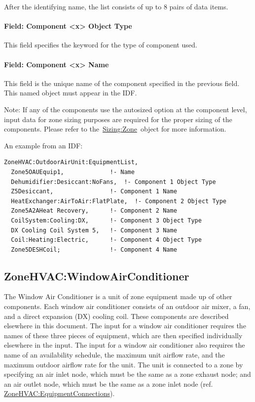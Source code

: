 After the identifying name, the list consists of up to 8 pairs of data items.

\paragraph{Field: Component \textless{}x\textgreater{} Object Type}\label{field-component-x-object-type-000}

This field specifies the keyword for the type of component used.

\paragraph{Field: Component \textless{}x\textgreater{} Name}\label{field-component-x-name-000}

This field is the unique name of the component specified in the previous field. This named object must appear in the IDF.

Note: If any of the components use the autosized option at the component level, input data for zone sizing purposes are required for the proper sizing of the components. Please refer to the~\hyperref[sizingzone]{Sizing:Zone}~object for more information.

An example from an IDF:

\begin{lstlisting}
ZoneHVAC:OutdoorAirUnit:EquipmentList,
  Zone5OAUEquip1,             !- Name
  Dehumidifier:Desiccant:NoFans,  !- Component 1 Object Type
  Z5Desiccant,                !- Component 1 Name
  HeatExchanger:AirToAir:FlatPlate,  !- Component 2 Object Type
  Zone5A2AHeat Recovery,      !- Component 2 Name
  CoilSystem:Cooling:DX,      !- Component 3 Object Type
  DX Cooling Coil System 5,   !- Component 3 Name
  Coil:Heating:Electric,      !- Component 4 Object Type
  Zone5DESHCoil;              !- Component 4 Name
\end{lstlisting}

\subsection{ZoneHVAC:WindowAirConditioner}\label{zonehvacwindowairconditioner}

The Window Air Conditioner is a unit of zone equipment made up of other components. Each window air conditioner consists of an outdoor air mixer, a fan, and a direct expansion (DX) cooling coil. These components are described elsewhere in this document. The input for a window air conditioner requires the names of these three pieces of equipment, which are then specified individually elsewhere in the input. The input for a window air conditioner also requires the name of an availability schedule, the maximum unit airflow rate, and the maximum outdoor airflow rate for the unit. The unit is connected to a zone by specifying an air inlet node, which must be the same as a zone exhaust node; and an air outlet node, which must be the same as a zone inlet node (ref. \hyperref[zonehvacequipmentconnections]{ZoneHVAC:EquipmentConnections}).

